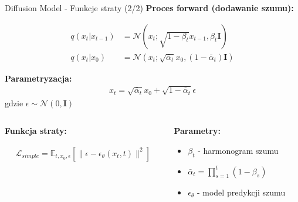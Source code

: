 \documentclass{beamer}
\begin{document}
\begin{frame}{Diffusion Model - Funkcje straty (2/2)}
  \textbf{Proces forward (dodawanie szumu):}
  \begin{tcolorbox}[
    colback=yellow!10!white, 
    colframe=black!60, 
    boxrule=0.5pt, 
    arc=3mm, 
    boxsep=0pt, 
    top=1pt, 
    bottom=1pt, 
    left=6pt, 
    right=6pt
  ]
    \vspace{-5pt}
    \begin{align*}
      q(x_t|x_{t-1}) &= \mathcal{N}(x_t; \sqrt{1-\beta_t}x_{t-1}, \beta_t\mathbf{I}) \\[-4pt]
      q(x_t|x_0) &= \mathcal{N}(x_t; \sqrt{\bar{\alpha}_t}x_0, (1-\bar{\alpha}_t)\mathbf{I})
    \end{align*}
    \vspace{-5pt}
  \end{tcolorbox}

  \textbf{Parametryzacja:}
  \begin{align*}
    x_t = \sqrt{\bar{\alpha}_t}x_0 + \sqrt{1-\bar{\alpha}_t}\epsilon
  \end{align*}
  gdzie $\epsilon \sim \mathcal{N}(0, \mathbf{I})$

  \vspace{0.5em}
  
  \begin{columns}
    \begin{column}{0.5\textwidth}
      \textbf{Funkcja straty:}
      \begin{tcolorbox}[
        colback=yellow!10!white, 
        colframe=black!60, 
        boxrule=0.5pt, 
        arc=3mm, 
        boxsep=0pt, 
        top=1pt, 
        bottom=1pt, 
        left=6pt, 
        right=6pt
      ]
        \vspace{-5pt}
        \begin{align*}
          \mathcal{L}_{simple} = \mathbb{E}_{t,x_0,\epsilon} \left[ \|\epsilon - \epsilon_\theta(x_t, t)\|^2 \right]
        \end{align*}
        \vspace{-5pt}
      \end{tcolorbox}
    \end{column}
    
    \begin{column}{0.5\textwidth}
      \textbf{Parametry:}
      \begin{itemize}
        \item $\beta_t$ - harmonogram szumu
        \item $\bar{\alpha}_t = \prod_{s=1}^{t} (1-\beta_s)$
        \item $\epsilon_\theta$ - model predykcji szumu
      \end{itemize}
    \end{column}
  \end{columns}
\end{frame}
\end{document}
